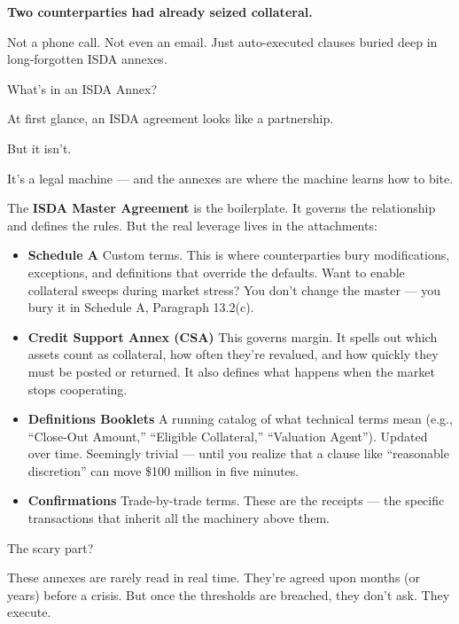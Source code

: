 \textbf{Two counterparties had already seized collateral.}

Not a phone call. Not even an email.
Just auto-executed clauses buried deep in long-forgotten ISDA annexes.

\medskip

\begin{TechnicalSidebar}{What’s in an ISDA Annex?}

  At first glance, an ISDA agreement looks like a partnership.

  \medskip
  
  But it isn’t.

  \medskip
  
  It’s a legal machine — and the annexes are where the machine learns how to bite.
  
  \medskip
  
  The \textbf{ISDA Master Agreement} is the boilerplate. It governs the relationship and defines the rules. But the real leverage lives in the attachments:

  \medskip
  
  \begin{itemize}
    \item \textbf{Schedule A}  
    Custom terms. This is where counterparties bury modifications, exceptions, and definitions that override the defaults. Want to enable collateral sweeps during market stress? You don’t change the master — you bury it in Schedule A, Paragraph 13.2(c).
  
    \item \textbf{Credit Support Annex (CSA)}  
    This governs margin. It spells out which assets count as collateral, how often they’re revalued, and how quickly they must be posted or returned. It also defines what happens when the market stops cooperating.
  
    \item \textbf{Definitions Booklets}  
    A running catalog of what technical terms mean (e.g., “Close-Out Amount,” “Eligible Collateral,” “Valuation Agent”). Updated over time. Seemingly trivial — until you realize that a clause like “reasonable discretion” can move \$100 million in five minutes.
  
    \item \textbf{Confirmations}  
    Trade-by-trade terms. These are the receipts — the specific transactions that inherit all the machinery above them.
  \end{itemize}
  
  \medskip
  
  The scary part?

  \medskip
  
  These annexes are rarely read in real time.  
  They’re agreed upon months (or years) before a crisis.  
  But once the thresholds are breached, they don’t ask. They execute.
  
\end{TechnicalSidebar}

